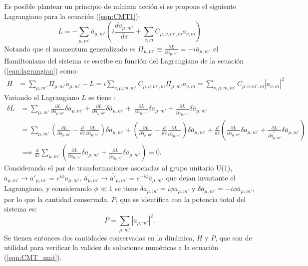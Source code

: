 Es posible plantear un principio de mínima acción si se propone el siguiente Lagrangiano para la ecuación (\ref{eqn:CMT1}):
\begin{equation}
	L = -\sum_{\mu, m'} \bar{a}_{\mu, m'}\left( i \frac{ d a_{\mu, m'}}{dz}   +
\sum_{\nu, m} C_{\mu, \nu, m', m}  a_{\nu, m}\right) \label{eqn:lagrangian}
\end{equation}
Notando que el momentum generalizado es $\Pi_{\mu, m'} \equiv \frac{\partial L}{\partial \dot{a}_{\mu, m'}} = -i\bar{a}_{\mu, m'}$ el Hamiltoniano del sistema se escribe en función del Lagrangiano de la ecuación (\ref{eqn:lagrangian}) como:
\begin{align}
	H &= \sum_{\mu, m'} \Pi_{\mu, m'} \dot{{a}}_{\mu, m'} - L = i\sum_{\nu, \mu, m, m'} C_{\mu, \nu, m', m} \Pi_{\mu, m'} a_{\nu, m} = \sum_{\nu, \mu, m, m'} C_{\mu, \nu, m', m} |a_{\nu, m}|^2 \label{eqn:hamiltoniano}
\end{align}
Variando el Lagrangiano $L$ se tiene \cite{NHsymmetries}:
\begin{align*}
	\delta L &= \sum_{\mu, m'} \frac{\partial L}{\partial a_{\mu, m'}} \delta a_{\mu, m'} +  \frac{\partial L}{\partial \bar{a}_{\mu, m'}} \delta \bar{a}_{\mu, m'} + \ \frac{\partial L}{\partial \dot{a}_{\mu, m'}} \delta \dot{a}_{\mu, m'} + \frac{\partial L}{\partial \dot{\bar{a}}_{\mu, m'}} \delta \dot{\bar{a}}_{\mu, m'}
	\\
	&= \sum_{\mu, m'} \left( \frac{\partial L}{\partial a_{\mu, m'}} - \frac{d}{dz}\frac{\partial L}{\partial \dot{a}_{\mu, m'}} \right)\delta a_{\mu, m'} + \left( \frac{\partial L}{\partial\bar{a}_{\mu, m'}} - \frac{d}{dz}\frac{\partial L}{\partial  \dot{\bar{a}}_{\mu, m'}} \right)\delta \bar{a}_{\mu, m'} + \frac{d}{dz}\left(\frac{\partial L}{\partial \dot{a}_{\mu, m'}}\delta a_{\mu, m'} +  \frac{\partial L}{\partial \dot{\bar{a}}^*_{\mu, m'}}\delta \bar{a}_{\mu, m'}\right)
	\\	
	&\implies  \frac{d}{dz} \sum_{\mu, m'}\left(\frac{\partial L}{\partial \dot{a}_{\mu, m'}}\delta a_{\mu, m'} +  \frac{\partial L}{\partial \dot{\bar{a}}_{\mu, m'}}\delta \bar{a}_{\mu, m'}\right) = 0.
\end{align*}
Considerando el par de transformaciones asociadas al grupo unitario U(1), $a_{\mu, m'}\to a'_{\mu, m'} = e^{i\phi}a_{\mu, m'}$, $\bar{a}_{\mu, m'}\to \bar{a'}_{\mu, m'} = e^{-i\phi}\bar{a}_{\mu, m'}$ que dejan invariante el Lagrangiano, y considerando $\phi \ll 1$ se tiene $\delta a_{\mu, m'} = i\phi a_{\mu, m'}$ y $\delta \bar{a}_{\mu, m'} = -i\phi \bar{a}_{\mu, m'}$, por lo que la cantidad conservada, $P$, que se identifica con la potencia total del sistema es:
\begin{equation}
	P = \sum_{\mu, m'} |a_{\mu, m'}|^2. \label{eqn:power}
\end{equation}
Se tienen entonces dos cantidades conservadas en la dinámica, $H$ y $P$, que son de utilidad para verificar la validez de soluciones numéricas a la ecuación (\ref{eqn:CMT_mat}).
